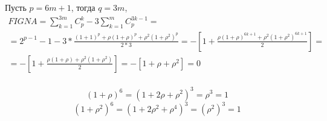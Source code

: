 Пусть $p = 6m + 1$, тогда $q = 3m$, 
\begin{multline*}
    FIGNA = \sum_{k=1}^{3m}{C_p^k} - 3 \sum_{k=1}^{m}{C_p^{3k-1}} = \\
    = 2^{p-1} - 1 - 3 * \frac{(1+1)^p + \rho (1 + \rho)^p + \rho^2 (1 + \rho^2)^p}{2 * 3} =
    - \left[1 + \frac{ \rho(1 + \rho)^{6k+1} + \rho^2 (1 + \rho^2)^{6k + 1}}{2} \right] = \\
    = -\left[1 + \frac{ \rho(1 + \rho) + \rho^2(1 + \rho^2)}{2} \right]
    = -\left[1 + \rho + \rho^2 \right] = 0 \\
\end{multline*}

$$  (1 + \rho)^6 = (1 + 2 \rho + \rho^2)^3 = \rho^3 = 1 $$
$$  (1 + \rho^2)^6 = (1 + 2 \rho^2 + \rho^4)^3 = (\rho^2)^3 = 1 $$

